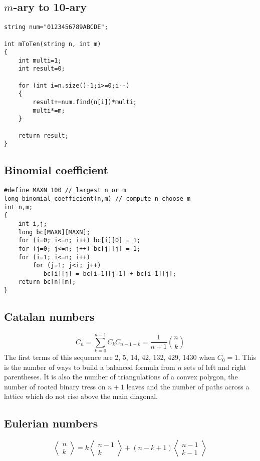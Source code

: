 \documentclass[a4paper]{article}
\begin{document}
\subsection{$m$-ary to 10-ary}

\begin{verbatim}
string num="0123456789ABCDE";

int mToTen(string n, int m)
{
	int multi=1;
	int result=0;

	for (int i=n.size()-1;i>=0;i--)
	{
		result+=num.find(n[i])*multi;
		multi*=m;
	}

	return result;
}
\end{verbatim}

\subsection{Binomial coefficient}

\begin{verbatim}
#define MAXN 100 // largest n or m
long binomial_coefficient(n,m) // compute n choose m
int n,m;
{
    int i,j;
    long bc[MAXN][MAXN];
    for (i=0; i<=n; i++) bc[i][0] = 1;
    for (j=0; j<=n; j++) bc[j][j] = 1;
    for (i=1; i<=n; i++)
        for (j=1; j<i; j++)
           bc[i][j] = bc[i-1][j-1] + bc[i-1][j];
    return bc[n][m];
}
\end{verbatim}

\subsection{Catalan numbers}

\begin{equation}
	C_{n}=\sum_{k=0}^{n-1}C_{k}C_{n-1-k}=\frac{1}{n+1}{n\choose k}
\end{equation}
The first terms of this sequence are 2, 5, 14, 42, 132, 429, 1430 when $C_{0} = 1$. This is the number of ways to build a balanced formula from $n$ sets of left and right parentheses. It is also the number of triangulations of a convex polygon, the number of rooted binary tress on $n+1$ leaves and the number of paths across a lattice which do not rise above the main diagonal.

\subsection{Eulerian numbers}

\begin{equation}
\left\langle\begin{matrix}
n \\ k
\end{matrix}\right\rangle=k\left\langle\begin{matrix}
n-1 \\ k
\end{matrix}\right\rangle+(n-k+1)\left\langle\begin{matrix}
n-1 \\ k-1
\end{matrix}\right\rangle
\end{equation}
\end{document}
